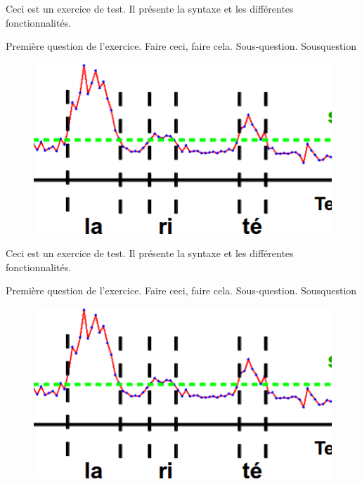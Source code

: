 Ceci est un exercice de test. Il présente la syntaxe et les différentes fonctionnalités.

\question Première question de l'exercice. Faire ceci, faire cela.
\subquestion Sous-question.
\question \subquestion Sousquestion


\begin{figure}
    \centering
    \includegraphics[width=\linewidth]{images/1.png}
\end{figure}

Ceci est un exercice de test. Il présente la syntaxe et les différentes fonctionnalités.

\question Première question de l'exercice. Faire ceci, faire cela.
\subquestion Sous-question.
\question \subquestion Sousquestion


\begin{figure}
    \centering
    \includegraphics[width=\linewidth]{images/1.png}
\end{figure}

